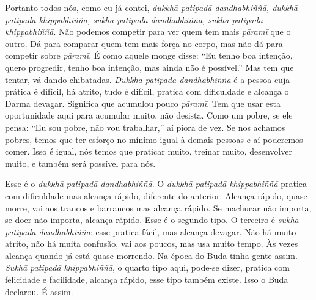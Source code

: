 Portanto todos nós, como eu já contei, \emph{dukkhā patipadā
dandhabhiññā, dukkhā patipadā khippabhiññā, sukhā patipadā
dandhabhiññā, sukhā patipadā khippabhiññā}. Não podemos
competir para ver quem tem mais \emph{pāramī} que o outro. Dá
para comparar quem tem mais força no corpo, mas não dá para competir
sobre \emph{pāramī}. É como aquele monge disse: “Eu tenho boa
intenção, quero progredir, tenho boa intenção, mas ainda não é
possível.” Mas tem que tentar, vá dando chibatadas. \emph{Dukkhā
patipadā dandhabhiññā} é a pessoa cuja prática é difícil, há
atrito, tudo é difícil, pratica com dificuldade e alcança o Darma
devagar. Significa que acumulou pouco \emph{pāramī}. Tem que
usar esta oportunidade aqui para acumular muito, não desista. Como um
pobre, se ele pensa: “Eu sou pobre, não vou trabalhar,” aí piora de
vez. Se nos achamos pobres, temos que ter esforço no mínimo igual à
demais pessoas e aí poderemos comer. Isso é igual, nós temos que
praticar muito, treinar muito, desenvolver muito, e também será
possível para nós.

Esse é o \emph{dukkhā patipadā dandhabhiññā}. O
\emph{dukkhā patipadā khippabhiññā} pratica com dificuldade mas
alcança rápido, diferente do anterior. Alcança rápido, quase morre, vai
aos trancos e barrancos mas alcança rápido. Se machucar não importa, se
doer não importa, alcança rápido. Esse é o segundo tipo. O terceiro é
\emph{sukhā patipadā dandhabhiññā}: esse pratica fácil, mas
alcança devagar. Não há muito atrito, não há muita confusão, vai aos
poucos, mas usa muito tempo. Às vezes alcança quando já está quase
morrendo. Na época do Buda tinha gente assim. \emph{Sukhā
patipadā khippabhiññā}, o quarto tipo aqui, pode-se dizer, pratica
com felicidade e facilidade, alcança rápido, esse tipo também existe.
Isso o Buda declarou. É assim.

